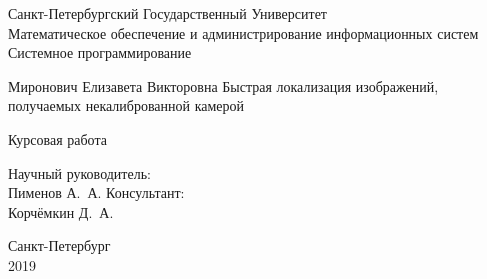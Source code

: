 \thispagestyle{empty}
\begin{center}
  {\instfont Санкт-Петербургский Государственный Университет\\
  Математическое обеспечение и администрирование информационных систем\\
  Системное программирование}
\end{center}

\vskip 4cm
\begin{center}
Миронович Елизавета Викторовна
  \vskip 1cm
{\LARGE Быстрая локализация изображений, получаемых некалиброванной камерой}

Курсовая работа
\end{center}
\vskip 2cm
\begin{flushright}
Научный руководитель:\\
Пименов А.~А.
\vskip 1cm
Консультант:\\
Корчёмкин Д.~А.
\end{flushright}
\vskip 5cm
\begin{center}
Санкт-Петербург\\
2019
\end{center}

\normalfont\clearpage
\endinput
